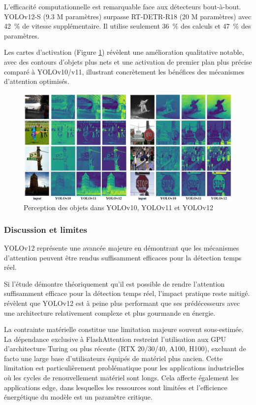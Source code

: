 L'efficacité computationnelle est remarquable face aux détecteurs bout-à-bout. YOLOv12-S (9.3 M paramètres) surpasse RT-DETR-R18 \cite{zhao_detrs_2024} (20 M paramètres) avec 42~\% de vitesse supplémentaire. Il utilise seulement 36~\% des calculs et 47~\% des paramètres.

Les cartes d'activation (Figure \ref{fig:ch2_yolo_10_perception}) révèlent une amélioration qualitative notable, avec des contours d'objets plus nets et une activation de premier plan plus précise comparé à YOLOv10/v11, illustrant concrètement les bénéfices des mécanismes d'attention optimisés.

\begin{figure}[H]
    \centering
    \includegraphics[width=1\linewidth]{02-main/figures/ch2/ch2_yolo_10_perception.png}
    \caption{Perception des objets dans YOLOv10, YOLOv11 et YOLOv12 \cite{tian_yolov12_2025}}
    \label{fig:ch2_yolo_10_perception}
\end{figure}

\subsubsection{Discussion et limites}
YOLOv12 représente une avancée majeure en démontrant que les mécanismes d'attention peuvent être rendus suffisamment efficaces pour la détection temps réel.

Si l'étude démontre théoriquement qu'il est possible de rendre l'attention suffisamment efficace pour la détection temps réel, l'impact pratique reste mitigé. \citeauthor{khanam_review_2025} \cite{khanam_review_2025} révèlent que YOLOv12 est à peine plus performant que ses prédécesseurs avec une architecture relativement complexe et plus gourmande en énergie.

La contrainte matérielle constitue une limitation majeure souvent sous-estimée. La dépendance exclusive à FlashAttention restreint l'utilisation aux GPU d'architecture Turing ou plus récente (RTX 20/30/40, A100, H100), excluant de facto une large base d'utilisateurs équipés de matériel plus ancien. Cette limitation est particulièrement problématique pour les applications industrielles où les cycles de renouvellement matériel sont longs. Cela affecte également les applications edge, dans lesquelles les ressources sont limitées et l'efficience énergétique du modèle est un paramètre critique.

